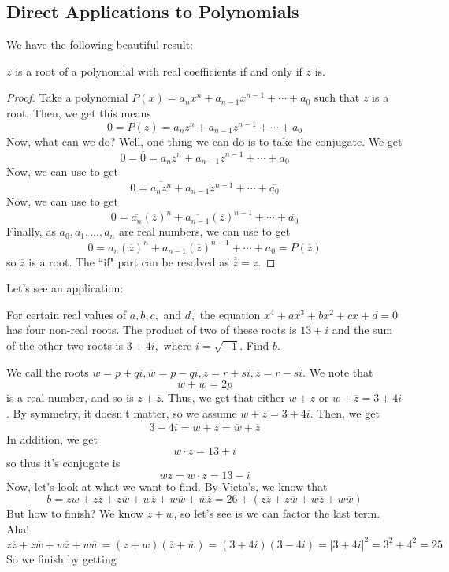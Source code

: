 \documentclass[11pt,titlepage]{scrartcl}
\begin{document}
\subsection{Direct Applications to Polynomials}
We have the following beautiful result:
\begin{theorem}\label{cct}
$z$ is a root of a polynomial with real coefficients if and only if $\overline z$ is.
\end{theorem}
\begin{proof}
Take a polynomial $P(x)=a_nx^n+a_{n-1}x^{n-1}+\cdots+a_0$ such that $z$ is a root. Then, we get this means
\[0=P(z)=a_nz^n+a_{n-1}z^{n-1}+\cdots+a_0\]
Now, what can we do? Well, one thing we can do is to take the conjugate. We get
\[0=\overline 0=\overline{a_nz^n+a_{n-1}z^{n-1}+\cdots+a_0}\]
Now, we can use  to get
\[0=\overline{a_nz^n}+\overline{a_{n-1}z^{n-1}}+\cdots+\overline{a_0}\]
Now, we can use  to get
\[0=\overline{a_n}(\overline z)^n+\overline{a_{n-1}}(\overline z)^{n-1}+\cdots+\overline{a_0}\]
Finally, as $a_0,a_1,\ldots,a_n$ are real numbers, we can use  to get
\[0=a_n(\overline{z})^n+a_{n-1}(\overline z)^{n-1}+\cdots+a_0=P(\overline z)\]
so $\overline z$ is a root. The ``if" part can be resolved as $\overline{\overline z}=z$.
\end{proof}
Let's see an application:
\begin{example}
For certain real values of $a, b, c,$ and $d_{},$ the equation $x^4+ax^3+bx^2+cx+d=0$ has four non-real roots. The product of two of these roots is $13+i$ and the sum of the other two roots is $3+4i,$ where $i=\sqrt{-1}.$ Find $b.$
\end{example}
We call the roots $w=p+qi,\overline w=p-qi,z=r+si,\overline z=r-si$. We note that
\[w+\overline w=2p\]
is a real number, and so is $z+\overline z$. Thus, we get that either $w+z$ or $w+\overline z=3+4i$. By symmetry, it doesn't matter, so we assume $w+z=3+4i$. Then, we get
\[3-4i=\overline{w+z}=\overline w+\overline z\]
In addition, we get
\[\overline w\cdot\overline z=13+i\]
so thus it's conjugate is
\[wz=w\cdot z=13-i\]
Now, let's look at what we want to find. By Vieta's, we know that
\[b=zw+z\overline z+z\overline w+w\overline z+w\overline w+\overline w\overline z=26+(z\overline z+z\overline w+w\overline z+w\overline w)\]
But how to finish? We know $z+w$, so let's see is we can factor the last term. Aha!
\[z\overline z+z\overline w+w\overline z+w\overline w=(z+w)(\overline z+\overline w)=(3+4i)(3-4i)=|3+4i|^2=3^2+4^2=25\]
So we finish by getting
\end{document}
